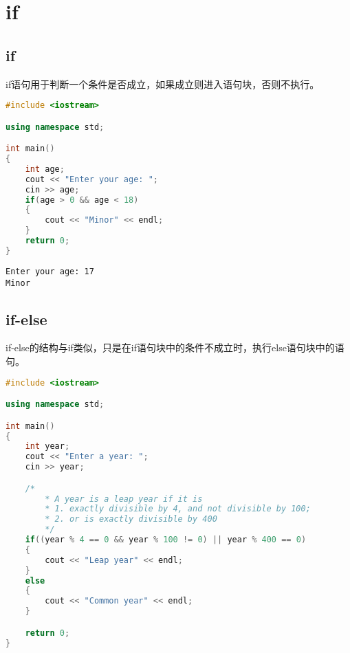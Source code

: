 \newpage

\section{if}

\subsection{if}

if语句用于判断一个条件是否成立，如果成立则进入语句块，否则不执行。\\


\begin{lstlisting}[language=C++]
#include <iostream>

using namespace std;

int main()
{
	int age;
	cout << "Enter your age: ";
	cin >> age;
	if(age > 0 && age < 18)
	{
		cout << "Minor" << endl;
	}
	return 0;
}
\end{lstlisting}

\begin{tcolorbox}
	\begin{verbatim}
Enter your age: 17
Minor
\end{verbatim}
\end{tcolorbox}

\vspace{0.5cm}

\subsection{if-else}

if-else的结构与if类似，只是在if语句块中的条件不成立时，执行else语句块中的语句。\\


\begin{lstlisting}[language=C++]
#include <iostream>

using namespace std;

int main()
{
	int year;
	cout << "Enter a year: ";
	cin >> year;

	/*
		* A year is a leap year if it is
		* 1. exactly divisible by 4, and not divisible by 100;
		* 2. or is exactly divisible by 400
		*/
	if((year % 4 == 0 && year % 100 != 0) || year % 400 == 0)
	{
		cout << "Leap year" << endl;
	}
	else
	{
		cout << "Common year" << endl;
	}

	return 0;
}
\end{lstlisting}

